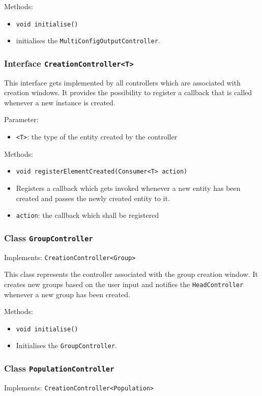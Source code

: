 \documentclass[parskip=full,11pt]{scrartcl}
\begin{document}
Methods:
\begin{itemize}\itemsep -10pt
	\item \texttt{void initialise()}
	\item[] initialises the \texttt{MultiConfigOutputController}.
\end{itemize}

\subsubsection{Interface \texttt{CreationController<T>}}

This interface gets implemented by all controllers which are associated with creation windows. It provides the possibility to register a callback that is called whenever a new instance is created.

Parameter:
\begin{itemize} \itemsep -10pt
	\item \texttt{<T>}: the type of the entity created by the controller
\end{itemize}

Methods:
\begin{itemize}\itemsep -10pt
	\item \texttt{void registerElementCreated(Consumer<T> action)}
	\item[] Registers a callback which gets invoked whenever a new entity has been created and passes the newly created entity to it.
	\item[] \texttt{action}: the callback which shall be registered
\end{itemize}

\subsubsection{Class \texttt{GroupController}}
Implements: \texttt{CreationController<Group>}

This class represents the controller associated with the group creation window. It creates new groups based on the user input and notifies the \texttt{HeadController} whenever a new group has been created.

Methods:
\begin{itemize}\itemsep -10pt
	\item \texttt{void initialise()}
	\item[] Initialises the \texttt{GroupController}.
\end{itemize}

\subsubsection{Class \texttt{PopulationController}}
Implements: \texttt{CreationController<Population>}
\end{document}
